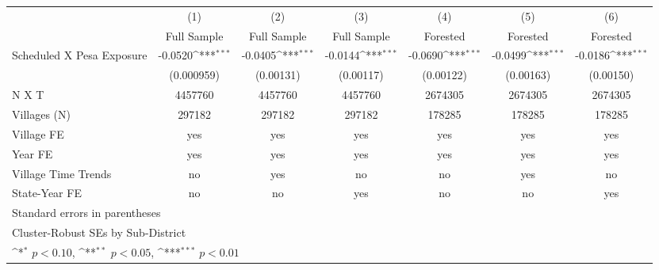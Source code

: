 {
\def\sym#1{\ifmmode^{#1}\else\(^{#1}\)\fi}
\begin{tabular}{l*{6}{c}}
\hline\hline
                    &\multicolumn{1}{c}{(1)}&\multicolumn{1}{c}{(2)}&\multicolumn{1}{c}{(3)}&\multicolumn{1}{c}{(4)}&\multicolumn{1}{c}{(5)}&\multicolumn{1}{c}{(6)}\\
                    &\multicolumn{1}{c}{Full Sample}&\multicolumn{1}{c}{Full Sample}&\multicolumn{1}{c}{Full Sample}&\multicolumn{1}{c}{Forested}&\multicolumn{1}{c}{Forested}&\multicolumn{1}{c}{Forested}\\
\hline
Scheduled X Pesa Exposure&     -0.0520\sym{***}&     -0.0405\sym{***}&     -0.0144\sym{***}&     -0.0690\sym{***}&     -0.0499\sym{***}&     -0.0186\sym{***}\\
                    &  (0.000959)         &   (0.00131)         &   (0.00117)         &   (0.00122)         &   (0.00163)         &   (0.00150)         \\
\hline
N X T               &     4457760         &     4457760         &     4457760         &     2674305         &     2674305         &     2674305         \\
Villages (N)        &      297182         &      297182         &      297182         &      178285         &      178285         &      178285         \\
Village FE          &         yes         &         yes         &         yes         &         yes         &         yes         &         yes         \\
Year FE             &         yes         &         yes         &         yes         &         yes         &         yes         &         yes         \\
Village Time Trends &          no         &         yes         &          no         &          no         &         yes         &          no         \\
State-Year FE       &          no         &          no         &         yes         &          no         &          no         &         yes         \\
\hline\hline
\multicolumn{7}{l}{\footnotesize Standard errors in parentheses}\\
\multicolumn{7}{l}{\footnotesize Cluster-Robust SEs by Sub-District}\\
\multicolumn{7}{l}{\footnotesize \sym{*} \(p<0.10\), \sym{**} \(p<0.05\), \sym{***} \(p<0.01\)}\\
\end{tabular}
}
